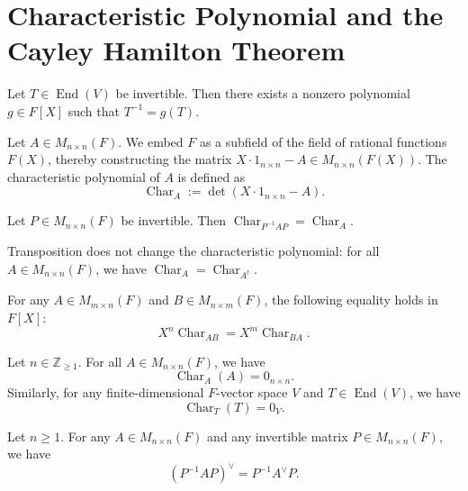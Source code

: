 \section{Characteristic Polynomial and the Cayley Hamilton Theorem}

\begin{proposition}
Let $T \in \operatorname{End}(V)$ be invertible. Then there exists a nonzero polynomial $g \in F[X]$ such that $T^{-1} = g(T)$.
\end{proposition}

\begin{definition}
Let $A \in M_{n \times n}(F)$. We embed $F$ as a subfield of the field of rational functions $F(X)$, thereby constructing the matrix $X \cdot 1_{n \times n} - A \in M_{n \times n}(F(X))$. The characteristic polynomial of $A$ is defined as
\[
\operatorname{Char}_A := \det(X \cdot 1_{n \times n} - A).
\]
\end{definition}

\begin{proposition}
Let $P \in M_{n \times n}(F)$ be invertible. Then $\operatorname{Char}_{P^{-1}AP} = \operatorname{Char}_A$.
\end{proposition}

\begin{proposition}
Transposition does not change the characteristic polynomial: for all $A \in M_{n \times n}(F)$, we have $\operatorname{Char}_A = \operatorname{Char}_{A^t}$.
\end{proposition}

\begin{proposition}
For any $A \in M_{m \times n}(F)$ and $B \in M_{n \times m}(F)$, the following equality holds in $F[X]$:
\[
X^n \operatorname{Char}_{AB} = X^m \operatorname{Char}_{BA}.
\]
\end{proposition}

\begin{theorem}
Let $n \in \mathbb{Z}_{\geq 1}$. For all $A \in M_{n \times n}(F)$, we have
\[
\operatorname{Char}_A(A) = 0_{n \times n}.
\]
Similarly, for any finite-dimensional $F$-vector space $V$ and $T \in \operatorname{End}(V)$, we have
\[
\operatorname{Char}_T(T) = 0_V.
\]
\end{theorem}

\begin{corollary}
Let $n \geq 1$. For any $A \in M_{n \times n}(F)$ and any invertible matrix $P \in M_{n \times n}(F)$, we have
\[
(P^{-1} A P)^\vee = P^{-1} A^\vee P.
\]
\end{corollary}

